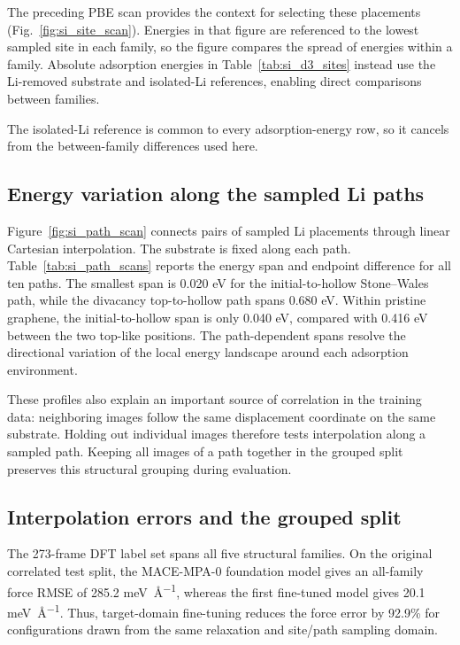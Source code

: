 The preceding PBE scan provides the context for selecting these placements
(Fig.~\ref{fig:si_site_scan}). Energies in that figure are referenced to the
lowest sampled site in each family, so the figure compares the spread of
energies within a family. Absolute adsorption energies in
Table~\ref{tab:si_d3_sites} instead use the Li-removed substrate and isolated-Li
references, enabling direct comparisons between families.



The isolated-Li reference is common to every adsorption-energy row, so it
cancels from the between-family differences used here.

\FloatBarrier
\subsection{Energy variation along the sampled Li paths}

Figure~\ref{fig:si_path_scan} connects pairs of sampled Li placements through
linear Cartesian interpolation. The substrate is fixed along each path.
Table~\ref{tab:si_path_scans} reports the energy span and endpoint difference
for all ten paths. The smallest span is 0.020 eV for the initial-to-hollow
Stone--Wales path, while the divacancy top-to-hollow path spans 0.680 eV.
Within pristine graphene, the initial-to-hollow span is only 0.040 eV, compared
with 0.416 eV between the two top-like positions. The path-dependent spans
resolve the directional variation of the local energy landscape around each
adsorption environment.




These profiles also explain an important source of correlation in the training
data: neighboring images follow the same displacement coordinate on the same
substrate. Holding out individual images therefore tests interpolation along
a sampled path. Keeping all images of a path together in the grouped split
preserves this structural grouping during evaluation.

\FloatBarrier
\subsection{Interpolation errors and the grouped split}
\label{sec:interpolation}

The 273-frame DFT label set spans all five structural families. On the original
correlated test split, the MACE-MPA-0 foundation model gives an all-family
force RMSE of 285.2 \si{\milli\electronvolt\per\angstrom}, whereas the first fine-tuned model gives
20.1 \si{\milli\electronvolt\per\angstrom}. Thus, target-domain fine-tuning reduces the force error by
92.9\% for configurations drawn from the same relaxation and site/path sampling
domain.

